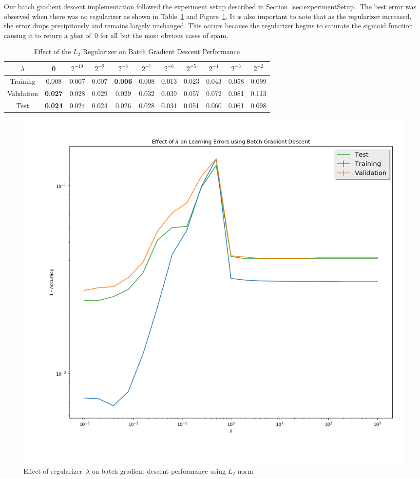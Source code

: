 \documentclass{report}
\begin{document}
  Our batch gradient descent implementation followed the experiment setup described in Section~\ref{sec:experimentSetup}.  The best error was observed when there was no regularizer as shown in Table~\ref{tab:batchGradientDescentL2} and Figure~\ref{fig:batchGdL2}.  It is also important to note that as the regularizer increased, the error drops precipitously and remains largely unchanged.  This occurs because the regularizer begins to saturate the sigmoid function causing it to return a $yhat$ of~$0$ for all but the most obvious cases of spam.
    
  \begin{table}[]
    \centering
    \caption{Effect of the $L_2$ Regularizer on Batch Gradient Descent Performance}
    \label{tab:batchGradientDescentL2}
    \begin{tabular}{c|c|c|c|c|c|c|c|c|c|c}
      \hline
      $\lambda$  & 0              & $2^{-10}$ & $2^{-9}$ & $2^{-8}$       & $2^{-7}$ & $2^{-6}$ & $2^{-5}$ & $2^{-4}$ & $2^{-3}$ & $2^{-2}$ \\ \hline
      Training   & 0.008          & 0.007     & 0.007    & \textbf{0.006} & 0.008    & 0.013    & 0.023    & 0.043    & 0.058    & 0.099    \\ \hline
      Validation & \textbf{0.027} & 0.028    & 0.029    & 0.029          & 0.032    & 0.039    & 0.057    & 0.072    & 0.081    & 0.113    \\ \hline
      Test       & \textbf{0.024} & 0.024     & 0.024    & 0.026          & 0.028    & 0.034    & 0.051    & 0.060    & 0.061    & 0.098    \\ \hline
    \end{tabular}
  \end{table}


  \begin{figure}
    \centering
    \includegraphics[scale=.3]{batch_GD_L2Norm}
    \caption{Effect of regularizer~$\lambda$ on batch gradient descent performance using $L_2$ norm}\label{fig:batchGdL2}
  \end{figure}
    
\end{document}
